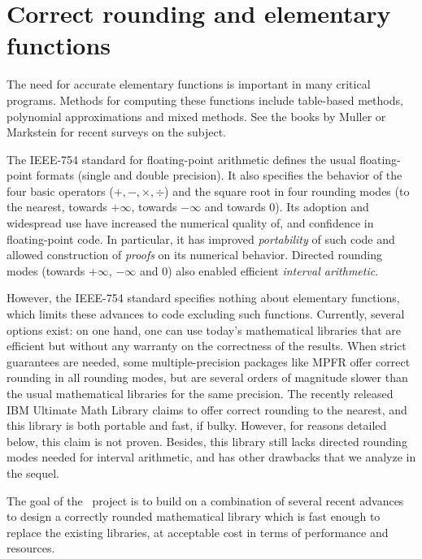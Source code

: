 


\section{Correct rounding and elementary functions}
\label{sect:intro}

The need for accurate elementary functions is important in many
critical programs.  Methods for computing these functions include
table-based methods\cite{Far81,Tan91}, polynomial approximations and
mixed methods\cite{DauMor2k}. See the books by Muller\cite{Muller97} or
Markstein\cite{Markstein2000} for recent surveys on the subject.

The IEEE-754 standard for floating-point arithmetic\cite{IEEE754}
defines the usual floating-point formats (single and double
precision). It also specifies the behavior of the four basic operators
($+,-,\times,\div$) and the square root in four rounding modes (to the
nearest, towards $+\infty$, towards $-\infty$ and towards $0$). Its
adoption and widespread use have increased the numerical quality of,
and confidence in floating-point code. In particular, it has improved
\emph{portability} of such code and allowed construction of
\emph{proofs} on its numerical behavior. Directed rounding modes
(towards $+\infty$, $-\infty$ and $0$) also enabled efficient
\emph{interval arithmetic}\cite{Moore66,KKLRW93}.

However, the IEEE-754 standard specifies nothing about elementary
functions, which limits these advances to code excluding such
functions.  Currently, several options exist: on one hand, one can use
today's mathematical libraries that are efficient but without any
warranty on the correctness of the results. When strict guarantees are
needed, some multiple-precision packages like MPFR \cite{MPFRweb}
offer correct rounding in all rounding modes, but are several orders
of magnitude slower than the usual mathematical libraries for the same
precision. The recently released IBM Ultimate Math
Library\cite{IBMlibultimweb} claims to offer correct rounding to the nearest,
and this library is both portable and fast, if bulky. However, for
reasons detailed below, this claim is not proven. Besides, this
library still lacks directed rounding modes needed for interval
arithmetic, and has other drawbacks that we analyze in the sequel.


The  goal of the \crlibm\ project is to build on a combination of several
recent advances to design a correctly rounded mathematical
library which is fast enough to replace the existing libraries, at acceptable
 cost in terms of performance and resources.




